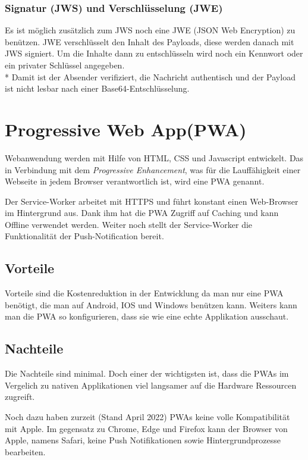 \subsubsection{Signatur (JWS) und Verschlüsselung (JWE)}
Es ist möglich zusätzlich zum JWS noch eine JWE (JSON Web Encryption) zu benützen. JWE verschlüsselt den Inhalt des Payloads, diese werden danach mit JWS signiert.
Um die Inhalte dann zu entschlüsseln wird noch ein Kennwort oder ein privater Schlüssel angegeben. \\*
Damit ist der Absender verifiziert, die Nachricht authentisch und der Payload ist nicht lesbar nach einer Base64-Entschlüsselung. \cite{JWTIONOS}


\section{Progressive Web App(PWA)}
\author{Bozidar Spasenovic}
Webanwendung werden mit Hilfe von HTML, CSS und Javascript entwickelt. 
Das in Verbindung mit dem \textit{Progressive Enhancement}, was für die Lauffähigkeit einer Webseite in jedem Browser verantwortlich ist, wird eine PWA genannt. 

Der Service-Worker arbeitet mit HTTPS und führt konstant einen Web-Browser im Hintergrund aus.
Dank ihm hat die PWA Zugriff auf Caching und kann Offline verwendet werden. 
Weiter noch stellt der Service-Worker die Funktionalität der Push-Notification bereit.  

\subsection{Vorteile}
Vorteile sind die Kostenreduktion in der Entwicklung da man nur eine PWA benötigt, die man auf Android, IOS und Windows benützen kann.
Weiters kann man die PWA so konfigurieren, dass sie wie eine echte Applikation ausschaut.

\subsection{Nachteile}
Die Nachteile sind minimal. Doch einer der wichtigsten ist, dass die PWAs im Vergelich zu nativen Applikationen viel langsamer auf die
Hardware Ressourcen zugreift. 

Noch dazu haben zurzeit (Stand April 2022) PWAs keine volle Kompatibilität mit Apple. Im gegensatz zu Chrome, Edge und Firefox
kann der Browser von Apple, namens Safari, keine Push Notifikationen sowie Hintergrundprozesse bearbeiten.

